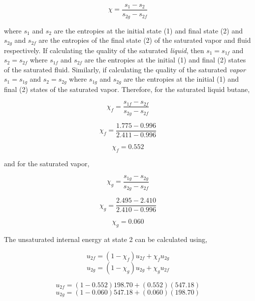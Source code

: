 \documentclass[10pt,parskip=half,
toc=sectionentrywithdots,
bibliography=totocnumbered,
captions=tableheading,numbers=noendperiod]{scrartcl}
\begin{document}
\begin{equation}\chi = \frac{s_1 - s_2}{s_{2g}-s_{2f}}\end{equation}

where \(s_1\) and \(s_2\) are the entropies at the initial state (1) and
final state (2) and \(s_{2g}\) and \(s_{2f}\) are the entropies of the
final state (2) of the saturated vapor and fluid respectively. If
calculating the quality of the saturated \emph{liquid}, then
\(s_1=s_{1f}\) and \(s_2=s_{2f}\) where \(s_{1f}\) and \(s_{2f}\) are
the entropies at the initial (1) and final (2) states of the saturated
fluid. Similarly, if calculating the quality of the saturated
\emph{vapor} \(s_1=s_{1g}\) and \(s_2 = s_{2g}\) where \(s_{1g}\) and
\(s_{2g}\) are the entropies at the initial (1) and final (2) states of
the saturated vapor. Therefore, for the saturated liquid butane,

\begin{equation}\chi_f = \frac{s_{1f} - s_{2f}}{s_{2g}-s_{2f}}\end{equation}

\begin{equation}\chi_f = \frac{1.775 - 0.996}{2.411-0.996}\end{equation}

\begin{equation}\chi_f = 0.552\end{equation}

and for the saturated vapor,

\begin{equation}\chi_g = \frac{s_{1g} - s_{2g}}{s_{2g}-s_{2f}}\end{equation}

\begin{equation}\chi_g= \frac{2.495 - 2.410}{2.410-0.996}\end{equation}

\begin{equation}\chi_g = 0.060\end{equation}

The unsaturated internal energy at state 2 can be calculated using,

\begin{equation}u_{2f} = (1-\chi_f)u_{2f} + \chi_f u_{2g}\end{equation}
\begin{equation}u_{2g} = (1-\chi_g)u_{2g} + \chi_g u_{2f}\end{equation}

\begin{equation}u_{2f} = (1-0.552)198.70 + (0.552)(547.18)\end{equation}
\begin{equation}u_{2g} = (1-0.060)547.18 + (0.060)(198.70)\end{equation}
\end{document}
